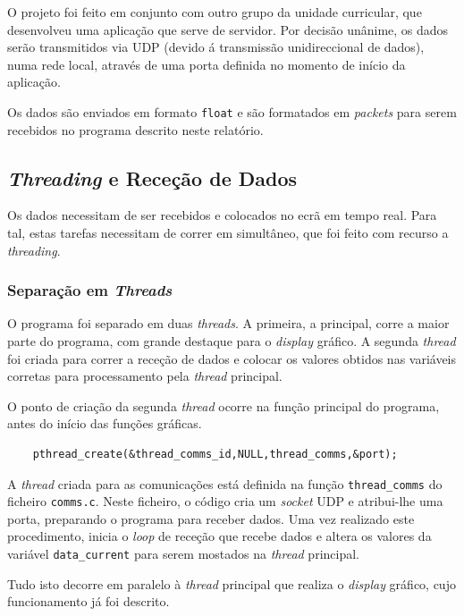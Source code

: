 \documentclass[palatino]{ist-report}
\begin{document}
O projeto foi feito em conjunto com outro grupo da unidade curricular, que desenvolveu uma aplicação que serve de servidor. Por decisão unânime, os dados serão transmitidos via UDP (devido á transmissão unidireccional de dados), numa rede local, através de uma porta definida no momento de início da aplicação.

Os dados são enviados em formato \texttt{float} e são formatados em \textit{packets} para serem recebidos no programa descrito neste relatório.

\subsection{\textit{Threading} e Receção de Dados}

Os dados necessitam de ser recebidos e colocados no ecrã em tempo real. Para tal, estas tarefas necessitam de correr em simultâneo, que foi feito com recurso a \textit{threading}.

\subsubsection{Separação em \textit{Threads}}\label{sec:threads}

O programa foi separado em duas \textit{threads}. A primeira, a principal, corre a maior parte do programa, com grande destaque para o \textit{display} gráfico. A segunda \textit{thread} foi criada para correr a receção de dados e colocar os valores obtidos nas variáveis corretas para processamento pela \textit{thread} principal.

O ponto de criação da segunda \textit{thread} ocorre na função principal do programa, antes do início das funções gráficas.
\begin{verbatim}
    pthread_create(&thread_comms_id,NULL,thread_comms,&port);
\end{verbatim}

A \textit{thread} criada para as comunicações está definida na função \texttt{thread\_comms} do ficheiro \texttt{comms.c}. Neste ficheiro, o código cria um \textit{socket} UDP e atribui-lhe uma porta, preparando o programa para receber dados. Uma vez realizado este procedimento, inicia o \textit{loop} de receção que recebe dados e altera os valores da variável \texttt{data\_current} para serem mostados na \textit{thread} principal.

Tudo isto decorre em paralelo à \textit{thread} principal que realiza o \textit{display} gráfico, cujo funcionamento já foi descrito.
\end{document}
